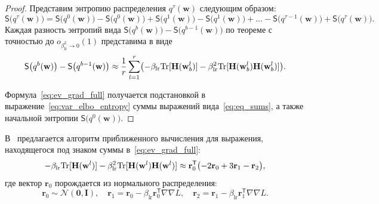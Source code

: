 \begin{proof} Представим энтропию распределения $q^\tau(\mathbf{w})$ следующим образом:
\[
\mathsf{S}\bigl(q^\tau(\mathbf{w})\bigr) = \mathsf{S}\bigl(q^0(\mathbf{w})\bigr) - \mathsf{S}\bigl(q^0(\mathbf{w})\bigr) + \mathsf{S}\bigl(q^1(\mathbf{w})\bigr) - \mathsf{S}\bigl(q^1(\mathbf{w})\bigr) +\dots -
\mathsf{S}\bigl(q^{\tau-1}(\mathbf{w})\bigr) + \mathsf{S}\bigl(q^\tau(\mathbf{w})\bigr).
\]
Каждая разность энтропий вида $\mathsf{S}\bigl(q^b(\mathbf{w})\bigr) - \mathsf{S}\bigl(q^{b-1}(\mathbf{w})\bigr)$ по теореме с точностью до $o_{\beta_{\text{lr}}^2 \to 0}(1)$ представима в виде
\begin{equation}
\label{eq:eq_sums}
	\mathsf{S}\bigl(q^b(\mathbf{w})\bigr) -  \mathsf{S}\bigl(q^{b-1}(\mathbf{w})\bigr)  \approx  \frac{1}{r}\sum_{l=1}^r \bigl(-\beta_{\text{lr}} \textnormal{Tr}[\mathbf{H}(\mathbf{w}_b^l)] - \beta_{\text{lr}}^2 \textnormal{Tr}[\mathbf{H}(\mathbf{w}_b^l)\mathbf{H}(\mathbf{w}_b^l)]  \bigr).
\end{equation}

Формула~\eqref{eq:ev_grad_full} получается подстановкой в выражение~\eqref{eq:var_elbo_entropy} суммы выражений вида~\eqref{eq:eq_sums}, а также начальной энтропии $\mathsf{S}\bigl(q^0(\mathbf{w}))$.
\end{proof}

В~\cite{early} предлагается алгоритм приближенного вычисления для выражения, находящегося под знаком суммы в~\eqref{eq:ev_grad_full}:
\[
	-\beta_{\text{lr}} \textnormal{Tr}[\mathbf{H}(\mathbf{w}^l)] - \beta_{\text{lr}}^2 \textnormal{Tr}[\mathbf{H}(\mathbf{w}^l)\mathbf{H}(\mathbf{w}^l)]  \approx \mathbf{r}_0^\mathsf{T}\bigl(-2\mathbf{r}_0 + 3\mathbf{r}_1 -\mathbf{r}_2\bigr),
\]
где вектор $\mathbf{r}_0$  порождается из нормального распределения:
$$\mathbf{r}_0 \sim \mathcal{N}(\mathbf{0}, \mathbf{I}), \quad \mathbf{r}_1 = \mathbf{r}_0 - \beta_{\text{lr}} \mathbf{r}_0^\mathsf{T} \nabla \nabla L, \quad \mathbf{r}_2 = \mathbf{r}_1 - \beta_{\text{lr}} \mathbf{r}_1^\mathsf{T} \nabla \nabla L.$$



